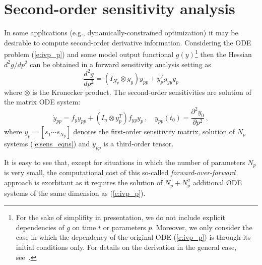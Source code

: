 \section{Second-order sensitivity analysis}\label{ss:hess_sensi}
In some applications (e.g., dynamically-constrained optimization) it may
be desirable to compute second-order derivative information. Considering 
the ODE problem (\ref{e:ivp_p}) and some model output functional 
$g(y)$\footnote{For the sake of simplifity in presentation, we do not 
include explicit dependencies of $g$ on time $t$ or parameters $p$.
Moreover, we only consider the case in which the dependency of the 
original ODE (\ref{e:ivp_p}) is through its initial conditions only.
For details on the derivation in the general case, see~\cite{OzBa:05}.}
then the Hessian $d^2g/dp^2$ can be obtained in a forward sensitivity
analysis setting as
\begin{equation}
\frac{d^2 g}{d p^2} = \left(I_{N_p} \otimes g_y \right ) y_{pp} + y_p^T g_{yy} y_p
\end{equation}
where $\otimes$ is the Kronecker product. The second-order sensitivities are
solution of the matrix ODE system:
\begin{equation}
  {\dot y}_{pp} = f_y y_{pp} + \left( I_n \otimes y_p^T \right) f_{yy} y_p \, , 
  \quad y_{pp}(t_0) = \frac{\partial^2 y_0}{\partial p^2} \, ,
\end{equation}
where $y_p = [s_1 \cdots s_{N_p}]$ denotes the first-order sensitivity matrix, 
solution of $N_p$ systems (\ref{e:sens_eqns}) and $y_{pp}$ is a third-order
tensor.

It is easy to see that, except for situations in which the number of parameters
$N_p$ is very small, the computational cost of this so-called {\em forward-over-forward} 
approach is exorbitant as it requires the solution of $N_p + N_p^2$ additional
ODE systems of the same dimension as (\ref{e:ivp_p}).

